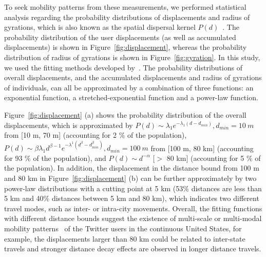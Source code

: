 \documentclass[ijgi,article,submit,moreauthors,pdftex,10pt,a4paper]{mdpi}
\theoremstyle{mdpi}
\newcounter{ex}
\newcounter{re}
\theoremstyle{mdpidefinition}
\begin{document}
To seek mobility patterns from these measurements, we performed statistical analysis regarding the probability distributions of displacements and radius of gyrations, which is also known as the spatial dispersal kernel $P(d)$~\cite{brockmann2006scaling}.
The probability distribution of the user displacements (as well as accumulated displacements) is shown in Figure~\ref{fig:displacement}, whereas the probability distribution of radius of gyrations is shown in Figure~\ref{fig:gyration}. 
In this study, we used the fitting methods developed by~\cite{Jurdak2015}.
The probability distributions of overall displacements, and the accumulated displacements and radius of gyrations of individuals, can all be approximated by a combination of three functions: an exponential function, a stretched-exponential function and a power-law function.

Figure~\ref{fig:displacement} (a) shows the probability distribution of the overall displacements, which is approximated by $P(d) \sim \lambda_{1} e^{-\lambda_{1}(d - d_{min})}, d_{min}=10~m$ from [10 m, 70 m] (accounting for 2 $\%$ of the population), $ P(d) \sim \beta\lambda_{1}d^{\beta-1}e^{-\lambda^{1}(d^\beta-d_{min}^\beta)}, d_{min}=100~m$ from [100 m, 80 km] (accounting for 93 $\%$ of the population), and $P(d) \sim {d}^{-\alpha}$ [$>$ 80 km] (accounting for 5 $\%$ of the population).
In addition, the displacement in the distance bound from 100 m and 80 km in Figure~\ref{fig:displacement} (b) can be further approximately by two power-law distributions with a cutting point at 5 km (53$\%$ distances are less than 5 km and 40$\%$ distances between 5 km and 80 km), which indicates two different travel modes, such as inter- or intra-city movements.
Overall, the fitting functions with different distance bounds suggest the existence of multi-scale or multi-modal mobility patterns~\cite{Jurdak2015} of the Twitter users in the continuous United States, for example, the displacements larger than 80 km could be related to inter-state travels and stronger distance decay effects are observed in longer distance travels. 
\end{document}
